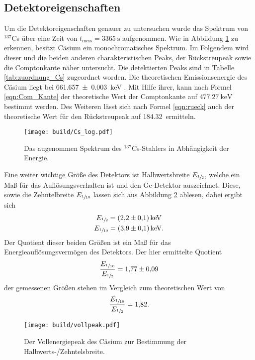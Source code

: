 \subsection{Detektoreigenschaften}
\label{sec:Detektoreigenschaften}
Um die Detektoreigenschaften genauer zu untersuchen wurde das Spektrum von ${}^{137}$Cs über eine Zeit
von $t_\text{mess} = \SI{3365}{\second}$ aufgenommen. Wie in Abbildung \ref{fig:Cs_log} zu erkennen, besitzt Cäsium
ein monochromatisches Spektrum. Im Folgendem wird dieser und die beiden anderen charakteristischen Peaks, der Rückstreupeak
sowie die Comptonkante näher untersucht. Die detektierten Peaks sind in Tabelle \ref{tab:zuordnung_Cs} zugeordnet worden. 
Die theoretischen Emissionsenergie des Cäsium liegt bei \SI{661.657(3)}{\kilo\electronvolt} \cite{referenz1}. Mit Hilfe
ihrer, kann nach Formel \ref{eqn:Com_Kante} der theoretische Wert der Comptonkante auf $\SI{477.27}{\kilo\electronvolt}$
bestimmt werden. Des Weiteren lässt sich nach Formel \ref{eqn:rueck} auch der theoretische Wert für den Rückstreupeak
auf \SI{184.32} ermitteln.
\begin{figure}[htb]
 \centering
 \texttt{[image: build/Cs\_log.pdf]}
 \caption{Das augenommen Spektrum des ${}^{137}$Cs-Stahlers in Abhängigkeit der Energie.}
 \label{fig:Cs_log}
\end{figure}

Eine weiter wichtige Größe des Detektors ist Halbwertsbreite $E_{\sfrac{1}{2}}$, welche ein Maß für das Auflösungsverhalten ist
und den Ge-Detektor auszeichnet. Diese, sowie die Zehntelbreite $E_{\sfrac{1}{10}}$ lassen sich aus Abbildung \ref{fig:Halb} ablesen, 
dabei ergibt sich 
\begin{gather}
  E_{\sfrac{1}{2}} = \SI{2.2(1)}{\kilo\electronvolt} \\
  E_{\sfrac{1}{10}} = \SI{3.9(1)}{\kilo\electronvolt}.
\end{gather}
Der Quotient dieser beiden Größen ist ein Maß für das Energieauflösungsvermögen des Detektors. Der hier ermittelte 
Quotient
\begin{equation}
  \frac{E_{\sfrac{1}{10}}}{E_{\sfrac{1}{2}}} = \num{1.77(9)}
\end{equation}
der gemessenen Größen stehen im Vergleich zum theoretischen Wert \cite{V18} von
\begin{equation}
  \frac{E_{\sfrac{1}{10}}}{E_{\sfrac{1}{2}}} = \num{1.82}.
\end{equation}
\begin{figure}[htb]
 \centering
 \texttt{[image: build/vollpeak.pdf]}
 \caption{Der Vollenergiepeak des Cäsium zur Bestimmung der Halbwerts-/Zehntelsbreite.}
 \label{fig:Halb}
\end{figure}
